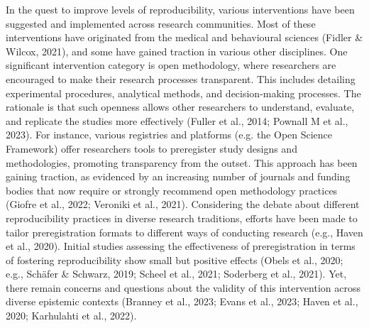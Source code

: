 \documentclass[authordate, meta]{jote-new-article}
\begin{document}
	In the quest to improve levels of reproducibility, various interventions have been suggested and implemented across research communities. Most of these interventions have originated from the medical and behavioural sciences (Fidler \& Wilcox, 2021), and some have gained traction in various other disciplines. One significant intervention category is open methodology, where researchers are encouraged to make their research processes transparent. This includes detailing experimental procedures, analytical methods, and decision-making processes. The rationale is that such openness allows other researchers to understand, evaluate, and replicate the studies more effectively (Fuller et al., 2014; Pownall M et al., 2023). For instance, various registries and platforms (e.g. the Open Science Framework) offer researchers tools to preregister study designs and methodologies, promoting transparency from the outset. This approach has been gaining traction, as evidenced by an increasing number of journals and funding bodies that now require or strongly recommend open methodology practices (Giofre et al., 2022; Veroniki et al., 2021). Considering the debate about different reproducibility practices in diverse research traditions, efforts have been made to tailor preregistration formats to different ways of conducting research (e.g., Haven et al., 2020). Initial studies assessing the effectiveness of preregistration in terms of fostering reproducibility show small but positive effects (Obels et al., 2020; e.g., Schäfer \& Schwarz, 2019; Scheel et al., 2021; Soderberg et al., 2021). Yet, there remain concerns and questions about the validity of this intervention across diverse epistemic contexts (Branney et al., 2023; Evans et al., 2023; Haven et al., 2020; Karhulahti et al., 2022).
\end{document}
